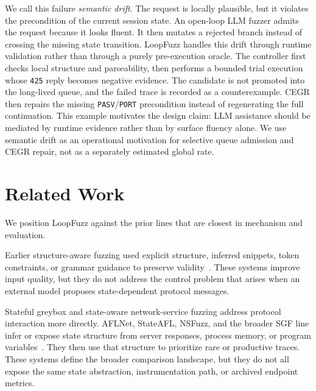 \documentclass[final,5p,times,number]{elsarticle}
\begin{document}
We call this failure \emph{semantic drift}. The request is locally plausible, but it violates the precondition of the current session state. An open-loop LLM fuzzer admits the request because it looks fluent. It then mutates a rejected branch instead of crossing the missing state transition. LoopFuzz handles this drift through runtime validation rather than through a purely pre-execution oracle. The controller first checks local structure and parseability, then performs a bounded trial execution whose \texttt{425} reply becomes negative evidence. The candidate is not promoted into the long-lived queue, and the failed trace is recorded as a counterexample. CEGR then repairs the missing \texttt{PASV}/\texttt{PORT} precondition instead of regenerating the full continuation. This example motivates the design claim: LLM assistance should be mediated by runtime evidence rather than by surface fluency alone. We use semantic drift as an operational motivation for selective queue admission and CEGR repair, not as a separately estimated global rate.

\section{Related Work}
We position LoopFuzz against the prior lines that are closest in mechanism and evaluation.

Earlier structure-aware fuzzing used explicit structure, inferred snippets, token constraints, or grammar guidance to preserve validity~\cite{snipuzz_black_box_fuzzing_2021,token_level_fuzzing_2021,gramatron_effective_grammar_aware_2021,griffin_grammar_free_dbms_2022,no_grammar_no_problem_2023,likely_invariants_feedback_2021,mundofuzz_grammar_inference_2022}. These systems improve input quality, but they do not address the control problem that arises when an external model proposes state-dependent protocol messages.

Stateful greybox and state-aware network-service fuzzing address protocol interaction more directly. AFLNet, StateAFL, NSFuzz, and the broader SGF line infer or expose state structure from server responses, process memory, or program variables~\cite{aflnet,stateafl,nsfuzz,sgf_usenix22,profuzzbench_benchmark_stateful_protocol_2021}. They then use that structure to prioritize rare or productive traces. These systems define the broader comparison landscape, but they do not all expose the same state abstraction, instrumentation path, or archived endpoint metrics.
\end{document}
